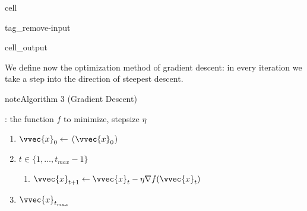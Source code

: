 \documentclass[letterpaper,10pt,english]{jupyterBook}
\begin{document}
\begin{sphinxuseclass}{cell}
\begin{sphinxuseclass}{tag_remove-input}\begin{sphinxVerbatimOutput}

\begin{sphinxuseclass}{cell_output}
\noindent{}

\end{sphinxuseclass}\end{sphinxVerbatimOutput}

\end{sphinxuseclass}
\end{sphinxuseclass}
\sphinxAtStartPar
We define now the optimization method of gradient descent: in every iteration we take a step into the direction of steepest descent.
\label{optimization_numerical:algorithm-6}
\begin{sphinxadmonition}{note}{Algorithm 3 (Gradient Descent)}



\sphinxAtStartPar
{}: the function \(f\) to minimize, step\sphinxhyphen{}size \(\eta\)
\begin{enumerate}
%
\item {} 
\sphinxAtStartPar
\(\vvec{x}_0\gets\) (\(\vvec{x}_0\))

\item {} 
\sphinxAtStartPar
{} \(t\in\{1,\ldots,t_{max}-1\}\)
\begin{enumerate}
%
\item {} 
\sphinxAtStartPar
\(\vvec{x}_{t+1}\leftarrow \vvec{x}_t - \eta \nabla f(\vvec{x}_t)\)

\end{enumerate}

\item {} 
\sphinxAtStartPar
{} \(\vvec{x}_{t_{max}}\)

\end{enumerate}
\end{sphinxadmonition}
\end{document}
